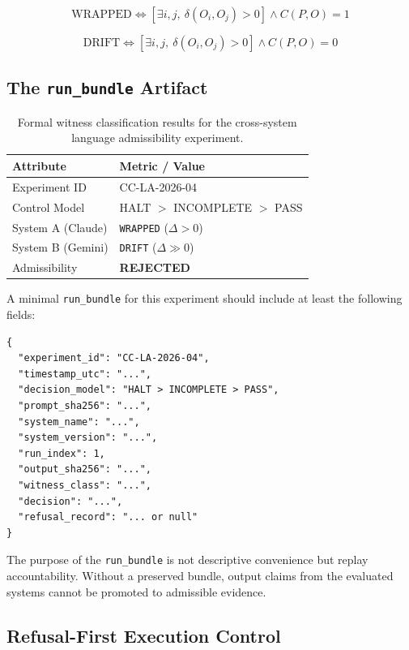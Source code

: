 \documentclass[11pt]{article}
\begin{document}
\[
\mathrm{WRAPPED} \iff
\left[
\exists i,j,\ \delta(O_i,O_j)>0
\right]
\land
C(P,O)=1
\]

\[
\mathrm{DRIFT} \iff
\left[
\exists i,j,\ \delta(O_i,O_j)>0
\right]
\land
C(P,O)=0
\]

\subsection{The \texttt{run\_bundle} Artifact}

\begin{table}[h]
\centering
\begin{tabular}{|l|l|}
\hline
\textbf{Attribute} & \textbf{Metric / Value} \\ \hline
Experiment ID & CC-LA-2026-04 \\ \hline
Control Model & HALT $>$ INCOMPLETE $>$ PASS \\ \hline
System A (Claude) & \texttt{WRAPPED} ($\Delta > 0$) \\ \hline
System B (Gemini) & \texttt{DRIFT} ($\Delta \gg 0$) \\ \hline
Admissibility & \textbf{REJECTED} \\ \hline
\end{tabular}
\caption{Formal witness classification results for the cross-system language admissibility experiment.}
\label{tab:witness_classification_results}
\end{table}

A minimal \texttt{run\_bundle} for this experiment should include at least the following fields:

\begin{verbatim}
{
  "experiment_id": "CC-LA-2026-04",
  "timestamp_utc": "...",
  "decision_model": "HALT > INCOMPLETE > PASS",
  "prompt_sha256": "...",
  "system_name": "...",
  "system_version": "...",
  "run_index": 1,
  "output_sha256": "...",
  "witness_class": "...",
  "decision": "...",
  "refusal_record": "... or null"
}
\end{verbatim}

The purpose of the \texttt{run\_bundle} is not descriptive convenience but replay accountability. Without a preserved bundle, output claims from the evaluated systems cannot be promoted to admissible evidence.

\subsection{Refusal-First Execution Control}
\end{document}

